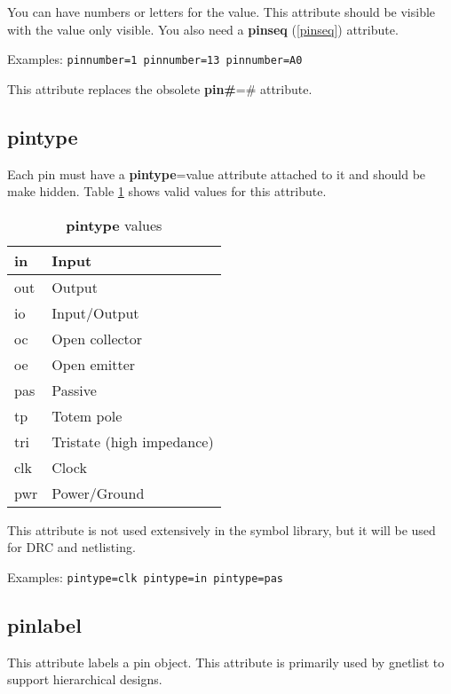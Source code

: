 \documentclass{article}
\begin{document}
You can have numbers or letters for the value.  This attribute should
be visible with the value only visible.  You also need a {\bf pinseq}
(\ref{pinseq}) attribute.

Examples: \texttt{pinnumber=1 pinnumber=13 pinnumber=A0}   

This attribute replaces the obsolete {\bf pin\#}=\# attribute.


\subsection{\bf pintype\label{pintype}}
Each pin must have a {\bf pintype}=value attribute attached to it and 
should be make hidden. Table \ref{pintype values} shows valid values for
this attribute.  

\vspace{.125in}

\begin{table}[h]
\begin{tabular}{|l|l|} \hline
in & Input \\ \hline
out & Output \\ \hline
io & Input/Output \\ \hline
oc & Open collector \\ \hline
oe & Open emitter \\ \hline
pas & Passive \\ \hline
tp & Totem pole \\ \hline
tri & Tristate (high impedance) \\ \hline
clk & Clock \\ \hline
pwr & Power/Ground \\ \hline
\end{tabular}
\caption{{\bf pintype} values} \label{pintype values}
\end{table}

\vspace{.125in}

This attribute is not used extensively in the symbol library, but it
will be used for DRC and netlisting.

Examples: \texttt{pintype=clk pintype=in pintype=pas}   


\subsection{\bf pinlabel\label{pinlabel}}
This attribute labels a pin object.  This attribute is primarily used 
by gnetlist to support hierarchical designs.
\end{document}
